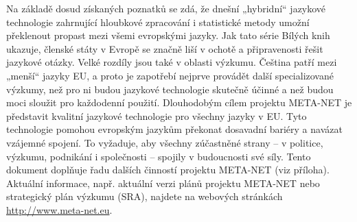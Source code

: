 \begin{multicols}{2}
Na základě dosud získaných poznatků se zdá, že dnešní „hybridní“ jazykové technologie zahrnující hloubkové zpracování i statistické metody umožní překlenout propast mezi všemi evropskými jazyky. Jak tato série Bílých knih ukazuje, členské státy v Evropě se značně liší v ochotě a připravenosti řešit jazykové otázky. Velké rozdíly jsou také v oblasti výzkumu. Čeština patří mezi „menší“ jazyky EU, a proto je zapotřebí nejprve provádět další specializované výzkumy, než pro ni budou jazykové technologie skutečně účinné a než budou moci sloužit pro každodenní použití.
Dlouhodobým cílem projektu META-NET je představit kvalitní jazykové technologie pro všechny jazyky v EU. Tyto technologie pomohou evropským jazykům překonat dosavadní bariéry a navázat vzájemné spojení. To vyžaduje, aby všechny zúčastněné strany – v politice, výzkumu, podnikání i společnosti – spojily v budoucnosti své síly.
Tento dokument doplňuje řadu dalších činností projektu META-NET (viz příloha).
Aktuální informace, např. aktuální verzi plánů projektu META-NET \cite{Meta1} nebo strategický plán výzkumu (SRA), najdete na webových stránkách \url{http://www.meta-net.eu}.
\end{multicols}
\clearpage




